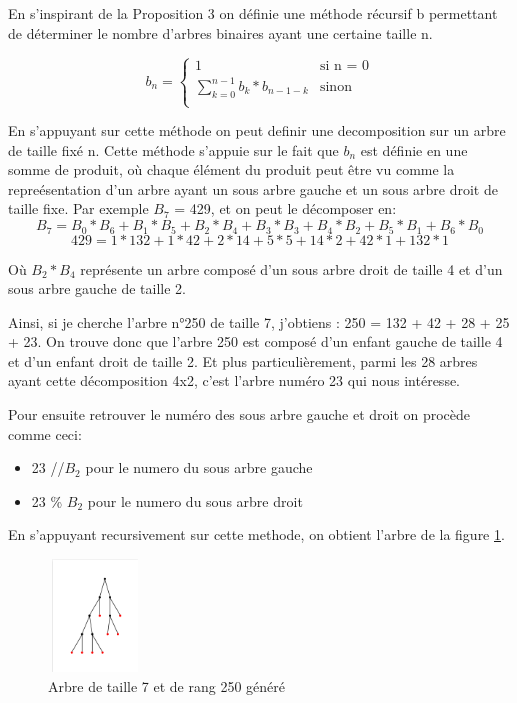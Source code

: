 \documentclass[french]{article}
\begin{document}
En s'inspirant de la Proposition 3 on définie une méthode récursif b permettant de déterminer le nombre d'arbres binaires ayant une certaine taille n.

\begin{equation}
    b_n =
    \begin{cases}
        1 & \text{si n = 0}\\
        \sum_{k=0}^{n-1}b_k*b_{n-1-k}  & \text{sinon}\\
    \end{cases}      
\end{equation}

En s'appuyant sur cette méthode on peut definir une decomposition sur un arbre de taille fixé n. Cette méthode s'appuie sur le fait que \(b_n\) est définie en une somme de produit, où chaque élément du produit peut être vu comme la repreésentation d'un arbre ayant un sous arbre gauche et un sous arbre droit de taille fixe. Par exemple \(B_7\) = 429, et on peut le décomposer en:
\[B_7=B_0*B_6+B_1*B_5+B_2*B_4+B_3*B_3+B_4*B_2+B_5*B_1+B_6*B_0\]
\[429=1*132+1*42+2*14+5*5+14*2+42*1+132*1\]

Où \(B_2*B_4\) représente un arbre composé d'un sous arbre droit de taille 4 et d'un sous arbre gauche de taille 2.

Ainsi, si je cherche l'arbre n\si{\degree}250 de taille 7, j'obtiens : 250 = 132 + 42 + 28 + 25 + 23. On trouve donc que l'arbre 250 est composé d'un enfant gauche de taille 4 et d'un enfant droit de taille 2. Et plus particulièrement, parmi les 28 arbres ayant cette décomposition 4x2, c'est l'arbre numéro 23 qui nous intéresse.


Pour ensuite retrouver le numéro des sous arbre gauche et droit on procède comme ceci:
\begin{itemize}
    \item 23 //\( B_2 \) pour le numero du sous arbre gauche
    \item 23 \% \(B_2\)   pour le numero du sous arbre droit
\end{itemize}

En s'appuyant recursivement sur cette methode, on obtient l'arbre de la figure \ref{fig:generation d'arbre}.

\begin{figure}[htp]
    \centering
    \includegraphics[width=2.5cm, height=3cm]{tree generation.png}
    \caption{Arbre de taille 7 et de rang 250 généré}
    \label{fig:generation d'arbre}
\end{figure}
\end{document}
